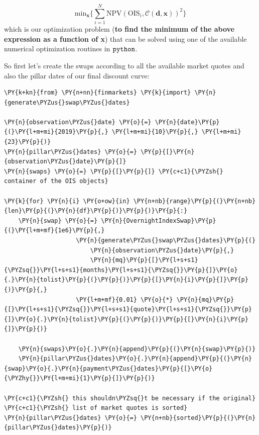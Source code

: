 \[\mathrm{min}_{\mathbf{x}} \Big\{\sum_{i=1}^{N}\mathrm{NPV}(\mathrm{OIS}_i, \mathcal{C}(\mathbf{d}, \mathbf{x}))^2\Big\}\]
which is our optimization problem (\textbf{to find the minimum of the
above expression as a function of x}) that can be solved using one of
the available numerical optimization routines in \(\tt{python}\).

So first let's create the swaps according to all the available market
quotes and also the pillar dates of our final discount curve:

    \begin{tcolorbox}[breakable, size=fbox, boxrule=1pt, pad at break*=1mm,colback=cellbackground, colframe=cellborder]
\begin{Verbatim}[commandchars=\\\{\}]
\PY{k+kn}{from} \PY{n+nn}{finmarkets} \PY{k}{import} \PY{n}{generate\PYZus{}swap\PYZus{}dates}

\PY{n}{observation\PYZus{}date} \PY{o}{=} \PY{n}{date}\PY{p}{(}\PY{l+m+mi}{2019}\PY{p}{,} \PY{l+m+mi}{10}\PY{p}{,} \PY{l+m+mi}{23}\PY{p}{)}
\PY{n}{pillar\PYZus{}dates} \PY{o}{=} \PY{p}{[}\PY{n}{observation\PYZus{}date}\PY{p}{]}
\PY{n}{swaps} \PY{o}{=} \PY{p}{[}\PY{p}{]} \PY{c+c1}{\PYZsh{} container of the OIS objects}

\PY{k}{for} \PY{n}{i} \PY{o+ow}{in} \PY{n+nb}{range}\PY{p}{(}\PY{n+nb}{len}\PY{p}{(}\PY{n}{df}\PY{p}{)}\PY{p}{)}\PY{p}{:}
    \PY{n}{swap} \PY{o}{=} \PY{n}{OvernightIndexSwap}\PY{p}{(}\PY{l+m+mf}{1e6}\PY{p}{,}
                    \PY{n}{generate\PYZus{}swap\PYZus{}dates}\PY{p}{(}
                        \PY{n}{observation\PYZus{}date}\PY{p}{,} 
                        \PY{n}{mq}\PY{p}{[}\PY{l+s+s1}{\PYZsq{}}\PY{l+s+s1}{months}\PY{l+s+s1}{\PYZsq{}}\PY{p}{]}\PY{o}{.}\PY{n}{tolist}\PY{p}{(}\PY{p}{)}\PY{p}{[}\PY{n}{i}\PY{p}{]}\PY{p}{)}\PY{p}{,}
                    \PY{l+m+mf}{0.01} \PY{o}{*} \PY{n}{mq}\PY{p}{[}\PY{l+s+s1}{\PYZsq{}}\PY{l+s+s1}{quote}\PY{l+s+s1}{\PYZsq{}}\PY{p}{]}\PY{o}{.}\PY{n}{tolist}\PY{p}{(}\PY{p}{)}\PY{p}{[}\PY{n}{i}\PY{p}{]}\PY{p}{)}

    \PY{n}{swaps}\PY{o}{.}\PY{n}{append}\PY{p}{(}\PY{n}{swap}\PY{p}{)}
    \PY{n}{pillar\PYZus{}dates}\PY{o}{.}\PY{n}{append}\PY{p}{(}\PY{n}{swap}\PY{o}{.}\PY{n}{payment\PYZus{}dates}\PY{p}{[}\PY{o}{\PYZhy{}}\PY{l+m+mi}{1}\PY{p}{]}\PY{p}{)}

\PY{c+c1}{\PYZsh{} this shouldn\PYZsq{}t be necessary if the original}
\PY{c+c1}{\PYZsh{} list of market quotes is sorted}
\PY{n}{pillar\PYZus{}dates} \PY{o}{=} \PY{n+nb}{sorted}\PY{p}{(}\PY{n}{pillar\PYZus{}dates}\PY{p}{)}
\end{Verbatim}
\end{tcolorbox}

